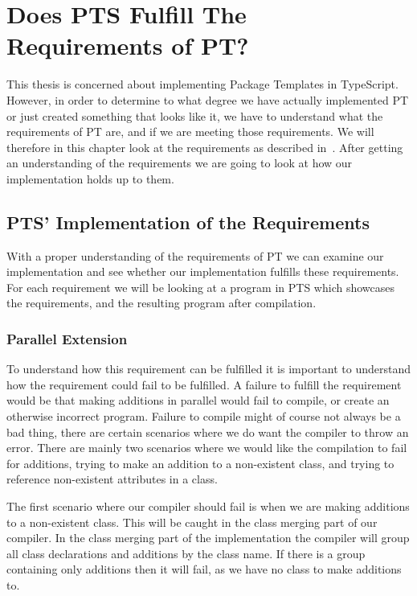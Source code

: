 \chapter{Does PTS Fulfill The Requirements of PT?}\label{ch:does-pts-fulfill-the-requirements-of-pt?}

This thesis is concerned about implementing Package Templates in TypeScript.
However, in order to determine to what degree we have actually implemented PT or just created something that looks like it, we have to understand what the requirements of PT are, and if we are meeting those requirements.
We will therefore in this chapter look at the requirements as described in~\cite{jot}.
After getting an understanding of the requirements we are going to look at how our implementation holds up to them.



\section{PTS' Implementation of the Requirements}\label{sec:pts'-implementation-of-the-requirements}

With a proper understanding of the requirements of PT we can examine our implementation and see whether our implementation fulfills these requirements.
For each requirement we will be looking at a program in PTS which showcases the requirements, and the resulting program after compilation.


\subsection{Parallel Extension}\label{subsec:pts-parallel-extension}

To understand how this requirement can be fulfilled it is important to understand how the requirement could fail to be fulfilled.
A failure to fulfill the requirement would be that making additions in parallel would fail to compile, or create an otherwise incorrect program.
Failure to compile might of course not always be a bad thing, there are certain scenarios where we do want the compiler to throw an error.
There are mainly two scenarios where we would like the compilation to fail for additions, trying to make an addition to a non-existent class, and trying to reference non-existent attributes in a class.

The first scenario where our compiler should fail is when we are making additions to a non-existent class.
This will be caught in the class merging part of our compiler.
In the class merging part of the implementation the compiler will group all class declarations and additions by the class name.
If there is a group containing only additions then it will fail, as we have no class to make additions to.

